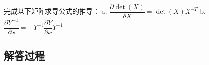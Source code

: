 \begin{example}[矩阵求导公式推导]
    完成以下矩阵求导公式的推导：  
    a. \(\dfrac{\partial \det(X)}{\partial X} = \det(X) X^{-T}\)  
    b. \(\dfrac{\partial Y^{-1}}{\partial x} = -Y^{-1} \dfrac{\partial Y}{\partial x} Y^{-1}\)
    \end{example}
    
    \subsection*{解答过程}
    